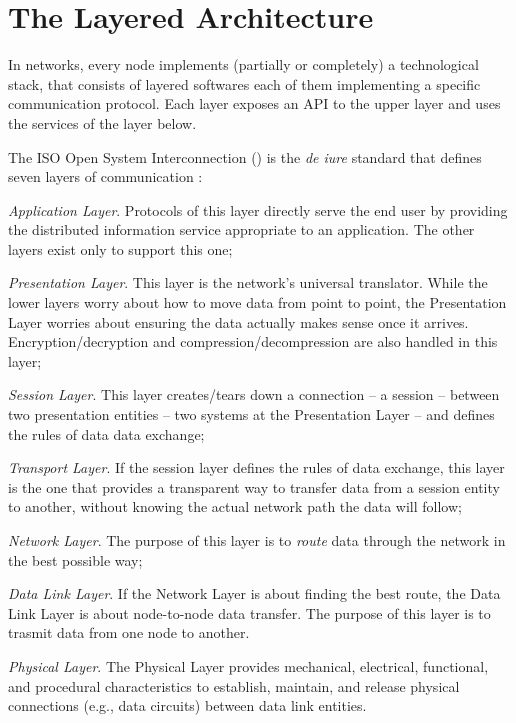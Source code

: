 \section{The Layered Architecture}
In  networks, every node implements (partially or completely) a technological stack, that consists of layered softwares each of them implementing a specific communication protocol.
Each layer exposes an API to the upper layer and uses the services of the layer below.

The ISO Open System Interconnection () is the \emph{de iure} standard that defines seven layers of communication \cite{zimmermann1980osi}:
\begin{etaremune}
    \item \emph{Application Layer}. Protocols of this layer directly serve the end user by providing the distributed information service appropriate to an application. The other layers exist only to support this one;
    \item \emph{Presentation Layer}. This layer is the network's universal translator. While the lower layers worry about how to move data from point to point, the Presentation Layer worries about ensuring the data actually makes sense once it arrives.
        Encryption/decryption and compression/decompression are also handled in this layer;
    \item \emph{Session Layer}. This layer creates/tears down a connection -- a session -- between two presentation entities -- two systems at the Presentation Layer -- and defines the rules of data data exchange;
    \item \emph{Transport Layer}. If the session layer defines the rules of data exchange, this layer is the one that provides a transparent way to transfer data from a session entity to another, without knowing the actual network path the data will follow;
    \item \emph{Network Layer}. The purpose of this layer is to \emph{route} data through the network in the best possible way;
    \item \emph{Data Link Layer}. If the Network Layer is about finding the best route, the Data Link Layer is about node-to-node data transfer. The purpose of this layer is to trasmit data from one node to another.
    \item \emph{Physical Layer}. The Physical Layer provides mechanical, electrical, functional, and procedural characteristics to establish, maintain, and release physical connections (e.g., data circuits) between data link entities.
\end{etaremune}

